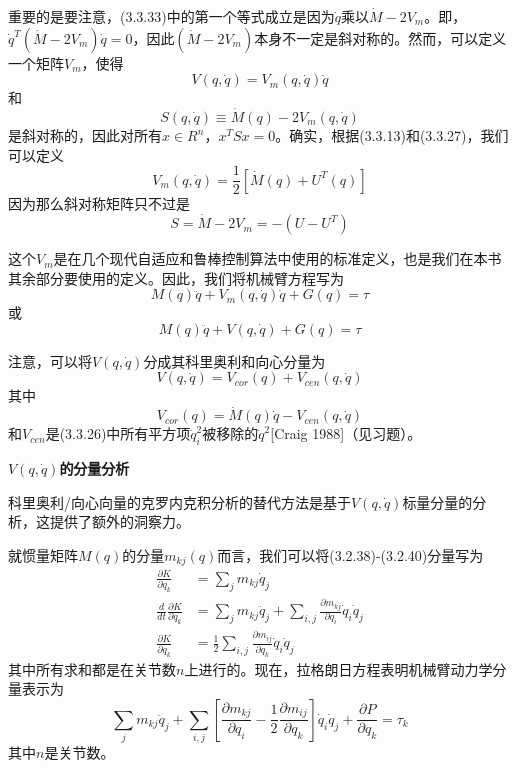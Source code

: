 \documentclass[12pt,a4paper]{ctexart}
\begin{document}
重要的是要注意，(3.3.33)中的第一个等式成立是因为$\dot{q}$乘以$\dot{M} - 2V_m$。即，$\dot{q}^T(\dot{M} - 2V_m)\dot{q} = 0$，因此$(\dot{M} - 2V_m)$本身不一定是斜对称的。然而，可以定义一个矩阵$V_m$，使得
\begin{equation}
V(q,\dot{q}) = V_m(q,\dot{q})\dot{q}
\end{equation}
和
\begin{equation}
S(q,\dot{q}) \equiv \dot{M}(q) - 2V_m(q,\dot{q})
\end{equation}
是斜对称的，因此对所有$x \in R^n$，$x^T S x = 0$。确实，根据(3.3.13)和(3.3.27)，我们可以定义
\begin{equation}
V_m(q,\dot{q}) = \frac{1}{2}[\dot{M}(q) + U^T(q)]
\end{equation}
因为那么斜对称矩阵只不过是
\begin{equation}
S = \dot{M} - 2V_m = -(U - U^T)
\end{equation}

这个$V_m$是在几个现代自适应和鲁棒控制算法中使用的标准定义，也是我们在本书其余部分要使用的定义。因此，我们将机械臂方程写为
\begin{equation}
M(q)\ddot{q} + V_m(q,\dot{q})\dot{q} + G(q) = \tau
\end{equation}
或
\begin{equation}
M(q)\ddot{q} + V(q,\dot{q}) + G(q) = \tau
\end{equation}

注意，可以将$V(q,\dot{q})$分成其科里奥利和向心分量为
\begin{equation}
V(q,\dot{q}) = V_{cor}(q) + V_{cen}(q,\dot{q})
\end{equation}
其中
\begin{equation}
V_{cor}(q) = \dot{M}(q)\dot{q} - V_{cen}(q,\dot{q})
\end{equation}
和$V_{cen}$是(3.3.26)中所有平方项$\dot{q}_i^2$被移除的$\dot{q}^2$[Craig 1988]（见习题）。

\textbf{$V(q,\dot{q})$的分量分析}

科里奥利/向心向量的克罗内克积分析的替代方法是基于$V(q,\dot{q})$标量分量的分析，这提供了额外的洞察力。

就惯量矩阵$M(q)$的分量$m_{kj}(q)$而言，我们可以将(3.2.38)-(3.2.40)分量写为
\begin{align}
\frac{\partial K}{\partial \dot{q}_k} &= \sum_{j}m_{kj}\dot{q}_j \\
\frac{d}{dt}\frac{\partial K}{\partial \dot{q}_k} &= \sum_{j}m_{kj}\ddot{q}_j + \sum_{i,j}\frac{\partial m_{kj}}{\partial q_i}\dot{q}_i\dot{q}_j \\
\frac{\partial K}{\partial q_k} &= \frac{1}{2}\sum_{i,j}\frac{\partial m_{ij}}{\partial q_k}\dot{q}_i\dot{q}_j
\end{align}
其中所有求和都是在关节数$n$上进行的。现在，拉格朗日方程表明机械臂动力学分量表示为
\begin{equation}
\sum_{j}m_{kj}\ddot{q}_j + \sum_{i,j}\left[\frac{\partial m_{kj}}{\partial q_i} - \frac{1}{2}\frac{\partial m_{ij}}{\partial q_k}\right]\dot{q}_i\dot{q}_j + \frac{\partial P}{\partial q_k} = \tau_k
\end{equation}
其中$n$是关节数。
\end{document}
